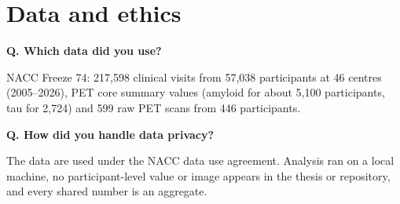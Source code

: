\documentclass[11pt,a4paper]{article}
\newcommand{\q}[1]{\par\medskip\textbf{Q. #1}\par}
\begin{document}
\section{Data and ethics}

\q{Which data did you use?}
NACC Freeze 74: 217,598 clinical visits from 57,038 participants at 46 centres (2005--2026), PET core summary values (amyloid for about 5,100 participants, tau for 2,724) and 599 raw PET scans from 446 participants.

\q{How did you handle data privacy?}
The data are used under the NACC data use agreement. Analysis ran on a local machine, no participant-level value or image appears in the thesis or repository, and every shared number is an aggregate.
\end{document}
